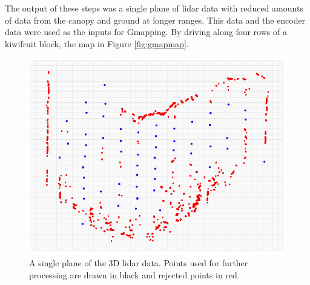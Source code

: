 \documentclass[preprint,authoryear,12pt]{elsarticle}
\begin{document}
    The output of these steps was a single plane of lidar data with reduced amounts of data from the canopy and ground at longer ranges.
	This data and the encoder data were used as the inputs for Gmapping.
	By driving along four rows of a kiwifruit block, the map in Figure \ref{fig:gmapmap}.

    \begin{figure}[htb]
        \centering
        \includegraphics[width=\linewidth]{imgs/single_plane_extraction/single_plane_extraction.pdf}
        \caption{
            A single plane of the 3D lidar data. Points used for further processing are drawn in black and rejected points in red.
        }
        \label{fig:singlePlaneExtraction}
    \end{figure}
\end{document}
